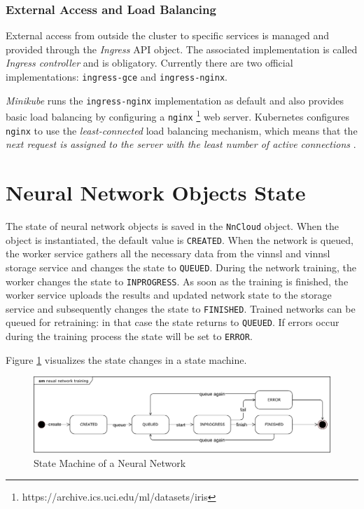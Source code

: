 \subsubsection{External Access and Load
Balancing}\label{external-access-and-load-balancing}

External access from outside the cluster to specific services is managed
and provided through the \emph{Ingress} API object. The associated
implementation is called \emph{Ingress controller} and is obligatory.
Currently there are two official implementations: \texttt{ingress-gce}
and \texttt{ingress-nginx}. \cite{kub-ingress}

\emph{Minikube} runs the \texttt{ingress-nginx} implementation as
default and also provides basic load balancing by configuring a
\texttt{nginx} \footnote{https://archive.ics.uci.edu/ml/datasets/iris}
web server. Kubernetes configures \texttt{nginx} to use the
\emph{least-connected} load balancing mechanism, which means that the
\emph{next request is assigned to the server with the least number of
active connections} \cite{nginx-loadbal}.

\section{Neural Network Objects
State}\label{neural-network-objects-state}

The state of neural network objects is saved in the \texttt{NnCloud}
object. When the object is instantiated, the default value is
\texttt{CREATED}. When the network is queued, the worker service gathers
all the necessary data from the vinnsl and vinnsl storage service and
changes the state to \texttt{QUEUED}. During the network training, the
worker changes the state to \texttt{INPROGRESS}. As soon as the training
is finished, the worker service uploads the results and updated network
state to the storage service and subsequently changes the state to
\texttt{FINISHED}. Trained networks can be queued for retraining: in
that case the state returns to \texttt{QUEUED}. If errors occur during
the training process the state will be set to \texttt{ERROR}.

Figure \ref{nn-states} visualizes the state changes in a state machine.

\begin{figure}
\centering
\includegraphics[width=15.00000cm]{images/nn-states}
\caption{State Machine of a Neural Network \label{nn-states}}
\end{figure}

